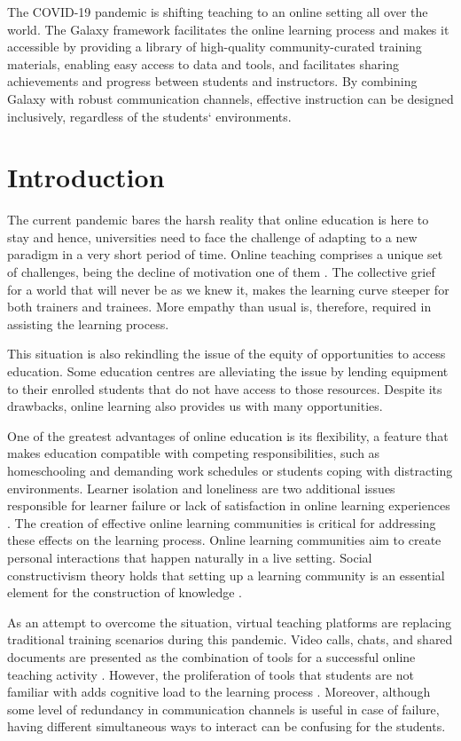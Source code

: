 The COVID-19 pandemic is shifting teaching to an online setting all over the world. The Galaxy framework facilitates the online learning process and makes it accessible by providing a library of high-quality community-curated training materials, enabling easy access to data and tools, and facilitates sharing achievements and progress between students and instructors. By combining Galaxy with robust communication channels, effective instruction can be designed inclusively, regardless of the students` environments.

\section*{Introduction}

The current pandemic bares the harsh reality that online education is here to stay and hence, universities need to face the challenge of adapting to a new paradigm in a very short period of time. Online teaching comprises a unique set of challenges, being the decline of motivation one of them \cite{selvi2010motivating}. The collective grief for a world that will never be as we knew it, makes the learning curve steeper for both trainers and trainees. More empathy than usual is, therefore, required in assisting the learning process.

This situation is also rekindling the issue of the equity of opportunities to access education. Some education centres are alleviating the issue by lending equipment to their enrolled students that do not have access to those resources. Despite its drawbacks, online learning also provides us with many opportunities.

One of the greatest advantages of online education is its flexibility, a feature that makes education compatible with competing responsibilities, such as homeschooling and demanding work schedules or students coping with distracting environments. Learner isolation and loneliness are two additional issues responsible for learner failure or lack of satisfaction in online learning experiences \cite{mcdonald2005breaking}. The creation of effective online learning communities is critical for addressing these effects on the learning process. Online learning communities aim to create personal interactions that happen naturally in a live setting. Social constructivism theory holds that setting up a learning community is an essential element for the construction of knowledge \cite{vygotsky1962thought,lee2014relationships}.

As an attempt to overcome the situation, virtual teaching platforms are replacing traditional training scenarios during this pandemic. Video calls, chats, and shared documents are presented as the combination of tools for a successful online teaching activity \cite{dabbagh2007online}. However, the proliferation of tools that students are not familiar with adds cognitive load to the learning process \cite{chen2011learners}. Moreover, although some level of redundancy in communication channels is useful in case of failure, having different simultaneous ways to interact can be confusing for the students.

